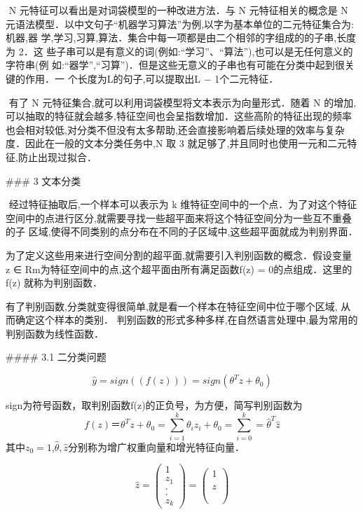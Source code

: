 ​	N 元特征可以看出是对词袋模型的一种改进方法．与 N 元特征相关的概念是 N 元语法模型．以中文句子“机器学习算法”为例,以字为基本单位的二元特征集合为:{机器,器 学,学习,习算,算法}．集合中每一项都是由二个相邻的字组成的的子串,长度为 2．这 些子串可以是有意义的词(例如:“学习”、“算法”),也可以是无任何意义的字符串(例 如:“器学”,“习算”)．但是这些无意义的子串也有可能在分类中起到很关键的作用．一 个长度为L的句子,可以提取出L − 1个二元特征．

​	有了 N 元特征集合,就可以利用词袋模型将文本表示为向量形式．随着 N 的增加, 可以抽取的特征就会越多,特征空间也会呈指数增加．这些高阶的特征出现的频率也会相对较低,对分类不但没有太多帮助,还会直接影响着后续处理的效率与复杂度．因此在一般的文本分类任务中,N 取 3 就足够了,并且同时也使用一元和二元特征,防止出现过拟合．

### 3 文本分类

​	经过特征抽取后,一个样本可以表示为 k 维特征空间中的一个点．为了对这个特征 空间中的点进行区分,就需要寻找一些超平面来将这个特征空间分为一些互不重叠的子 区域,使得不同类别的点分布在不同的子区域中,这些超平面就成为判别界面．

​	为了定义这些用来进行空间分割的超平面,就需要引入判别函数的概念．假设变量 z ∈ Rm为特征空间中的点,这个超平面由所有满足函数f(z) = 0的点组成．这里的f(z) 就称为判别函数．

​	有了判别函数,分类就变得很简单,就是看一个样本在特征空间中位于哪个区域, 从而确定这个样本的类别．  判别函数的形式多种多样,在自然语言处理中,最为常用的判别函数为线性函数．

#### 3.1 二分类问题

$$
\hat y =sign((f(z))) = sign(\theta^Tz+\theta_0)
$$

sign为符号函数，取判别函数f(z)的正负号，为方便，简写判别函数为
$$
f(z) ＝ \theta^Tz+\theta_0 = \sum_{i=1}^{k}\theta_iz_i + \theta_0 = \sum_{i=0}^{k} = \hat \theta^T \hat z
$$
其中$z_0=1$,$\hat\theta,\hat{z}$分别称为增广权重向量和增光特征向量．

$$
\hat z = \left( 
		        \begin{array} {ccc} 1 \\  z_1\\ .\\ .\\  z_k
		        \end{array}
        	    \right) 
                =  \left( 
        	    \begin{array}{ccc}
		        1 \\ \\ z \\ \\  \\  
		        \end{array}
        	    \right)
$$

